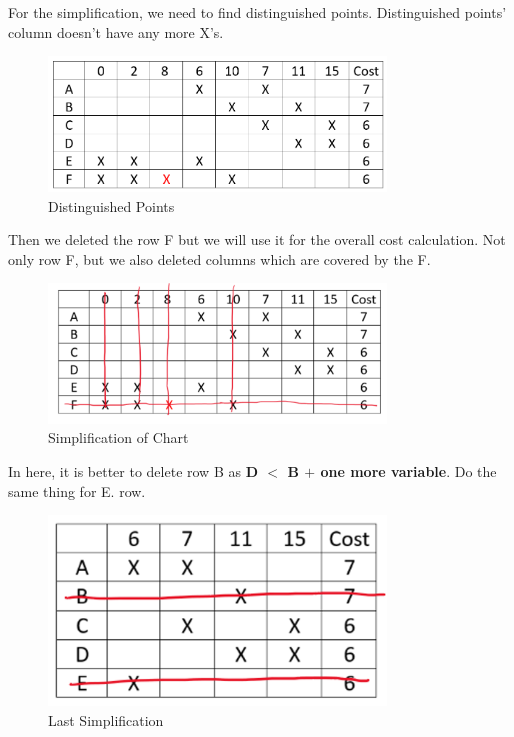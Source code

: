 \documentclass[pdftex,12pt,a4paper]{article}
\begin{document}
For the simplification, we need to find distinguished points. Distinguished points' column doesn't have any more X's.

   \begin{figure}[H]
    	\centering
    	\includegraphics[width=0.8\textwidth]{preliminary/distinguished_point.png}	
    	\caption{Distinguished Points}
    	\label{Distinguished Points}
    \end{figure}

    Then we deleted the row F but we will use it for the overall cost calculation. Not only row F, but we also deleted columns which are covered by the F.

   \begin{figure}[H]
    	\centering
    	\includegraphics[width=0.8\textwidth]{preliminary/simplification_of_chart.png}	
    	\caption{Simplification of Chart}
    	\label{Simplification of Chart}
    \end{figure}

In here, it is better to delete row B as \textbf{D $<$ B $+$ one more variable}.
Do the same thing for E. row. 
    
   \begin{figure}[H]
    	\centering
    	\includegraphics[width=0.8\textwidth]{preliminary/last_simplification.png}	
    	\caption{Last Simplification}
    	\label{Last Simplification}
    \end{figure}
\end{document}
